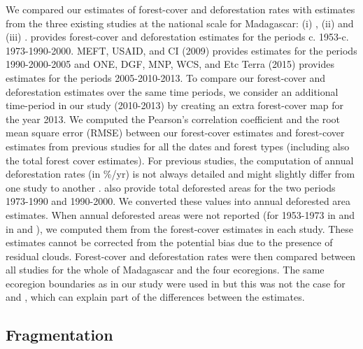 \documentclass[a4paper, 12pt, leqno]{article} %
\begin{document}
We compared our estimates of forest-cover and deforestation rates with
estimates from the three existing studies at the national scale for
Madagascar: (i) \citep{Harper2007}, (ii) \citep{MEFT2009} and (iii)
\citep{ONE2015}. \citet{Harper2007} provides forest-cover and
deforestation estimates for the periods
c. 1953-c. 1973-1990-2000. MEFT, USAID, and CI (2009) provides
estimates for the periods 1990-2000-2005 and ONE, DGF, MNP, WCS, and
Etc Terra (2015) provides estimates for the periods 2005-2010-2013. To
compare our forest-cover and deforestation estimates over the same
time periods, we consider an additional time-period in our study
(2010-2013) by creating an extra forest-cover map for the year
2013. We computed the Pearson's correlation coefficient and the root
mean square error (RMSE) between our forest-cover estimates and
forest-cover estimates from previous studies for all the dates and
forest types (including also the total forest cover estimates). For
previous studies, the computation of annual deforestation rates (in
\%/yr) is not always detailed and might slightly differ from one study
to another \citep[see][]{Puyravaud2003}. \citet{Harper2007} also
provide total deforested areas for the two periods 1973-1990 and
1990-2000. We converted these values into annual deforested area
estimates. When annual deforested areas were not reported (for
1953-1973 in \citet{Harper2007} and in \citet{MEFT2009} and
\citet{ONE2015}), we computed them from the forest-cover estimates in
each study. These estimates cannot be corrected from the potential
bias due to the presence of residual clouds. Forest-cover and
deforestation rates were then compared between all studies for the
whole of Madagascar and the four ecoregions. The same ecoregion
boundaries as in our study were used in \citet{ONE2015} but this was
not the case for \citet{Harper2007} and \citet{MEFT2009}, which can
explain part of the differences between the estimates.

\subsection{Fragmentation}
\end{document}
